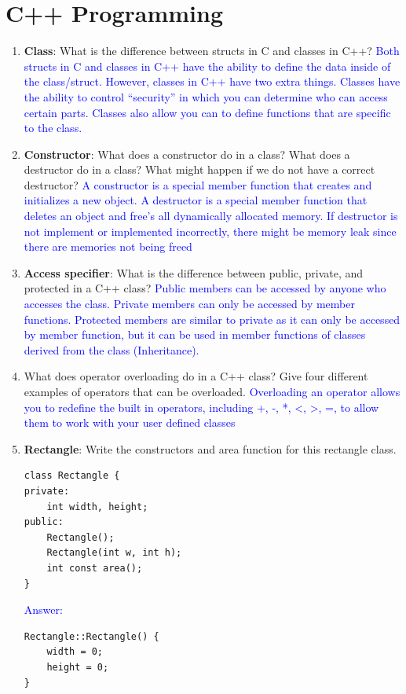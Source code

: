 \documentclass{article}
\begin{document}
\section{C++ Programming}

\begin{enumerate}[label=(\alph*)]
    \item \textbf{Class}: What is the difference between structs in C and classes in C++?
    \newline\textcolor{blue}{Both structs in C and classes in C++ have the ability to define the data inside of the class/struct. However,  classes in C++ have two extra things. Classes have the ability to control “security” in which you can determine who can access certain parts. Classes also allow you can to define functions that are specific to the class.}
    \item \textbf{Constructor}: What does a constructor do in a class? What does a destructor do in a class? What might happen if we do not have a correct destructor?
    \newline\textcolor{blue}{A constructor is a special member function that creates and initializes a new object. A destructor is a special member function that deletes an object and free’s all dynamically allocated memory. If destructor is not implement or implemented incorrectly, there might be memory leak since there are memories not being freed}
    \item \textbf{Access specifier}: What is the difference between public, private, and protected in a C++ class?
    \newline\textcolor{blue}{Public members can be accessed by anyone who accesses the class. Private members can only be accessed by member functions. Protected members are similar to private as it can only be accessed by member function, but it can be used in member functions of classes derived from the class (Inheritance).}
    \item What does operator overloading do in a C++ class? Give four different examples of operators that can be overloaded.
    \newline\textcolor{blue}{Overloading an operator allows you to redefine the built in operators, including +, -, *, <, >, =, to allow them to work with your user defined classes}
    \item \textbf{Rectangle}: Write the constructors and area function for this rectangle class.
    \begin{lstlisting}[style=CStyle]
class Rectangle {
private:
    int width, height;
public:
    Rectangle();
    Rectangle(int w, int h);
    int const area();
}
\end{lstlisting}
\textcolor{blue}{Answer:}
\begin{lstlisting}[style=CStyle]
Rectangle::Rectangle() {
    width = 0;
    height = 0;
}


\end{lstlisting}
\end{enumerate}
\end{document}
